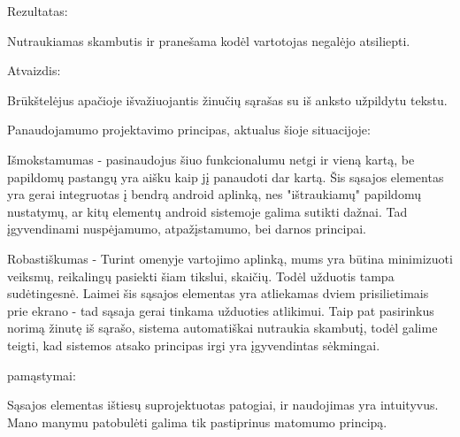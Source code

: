 ﻿\documentclass[a4paper, 12pt]{article}
\begin{document}
		Rezultatas:

		Nutraukiamas skambutis ir pranešama kodėl vartotojas negalėjo atsiliepti.\newline

		Atvaizdis:

		Brūkštelėjus apačioje išvažiuojantis žinučių sąrašas su iš anksto užpildytu tekstu.\newline

		Panaudojamumo projektavimo principas, aktualus šioje situacijoje:

		Išmokstamumas - pasinaudojus šiuo funkcionalumu netgi ir vieną kartą,
		be papildomų pastangų yra aišku kaip jį panaudoti dar kartą. Šis sąsajos
		elementas yra gerai integruotas į bendrą android aplinką, nes "ištraukiamų"
		papildomų nustatymų, ar kitų elementų android sistemoje galima sutikti dažnai.
		Tad įgyvendinami nuspėjamumo, atpažįstamumo, bei darnos principai.

		Robastiškumas - Turint omenyje vartojimo aplinką, mums yra būtina minimizuoti
		veiksmų, reikalingų pasiekti šiam tikslui, skaičių. Todėl užduotis tampa
		sudėtingesnė. Laimei šis sąsajos elementas yra atliekamas dviem prisilietimais
		prie ekrano - tad sąsaja gerai tinkama užduoties atlikimui. Taip pat pasirinkus
		norimą žinutę iš sąrašo, sistema automatiškai nutraukia skambutį, todėl galime
		teigti, kad sistemos atsako principas irgi yra įgyvendintas sėkmingai.

		pamąstymai:

		Sąsajos elementas ištiesų suprojektuotas patogiai, ir naudojimas yra intuityvus.
		Mano manymu patobulėti galima tik pastiprinus matomumo principą. 
\end{document}
